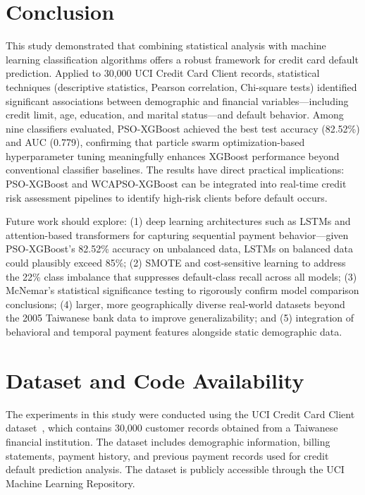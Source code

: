 \documentclass[sigconf]{acmart}
\begin{document}
\section{Conclusion}

This study demonstrated that combining statistical analysis with machine learning classification algorithms offers a robust framework for credit card default prediction. Applied to 30,000 UCI Credit Card Client records, statistical techniques (descriptive statistics, Pearson correlation, Chi-square tests) identified significant associations between demographic and financial variables---including credit limit, age, education, and marital status---and default behavior. Among nine classifiers evaluated, PSO-XGBoost achieved the best test accuracy (82.52\%) and AUC (0.779), confirming that particle swarm optimization-based hyperparameter tuning meaningfully enhances XGBoost performance beyond conventional classifier baselines. The results have direct practical implications: PSO-XGBoost and WCAPSO-XGBoost can be integrated into real-time credit risk assessment pipelines to identify high-risk clients before default occurs.

Future work should explore: (1) deep learning architectures such as LSTMs and attention-based transformers for capturing sequential payment behavior---given PSO-XGBoost's 82.52\% accuracy on unbalanced data, LSTMs on balanced data could plausibly exceed 85\%; (2) SMOTE and cost-sensitive learning to address the 22\% class imbalance that suppresses default-class recall across all models; (3) McNemar's statistical significance testing to rigorously confirm model comparison conclusions; (4) larger, more geographically diverse real-world datasets beyond the 2005 Taiwanese bank data to improve generalizability; and (5) integration of behavioral and temporal payment features alongside static demographic data.




\section{Dataset and Code Availability}

The experiments in this study were conducted using the UCI Credit Card Client dataset~\cite{yeh2009comparisons}, which contains 30,000 customer records obtained from a Taiwanese financial institution. The dataset includes demographic information, billing statements, payment history, and previous payment records used for credit default prediction analysis. The dataset is publicly accessible through the UCI Machine Learning Repository.
\end{document}
